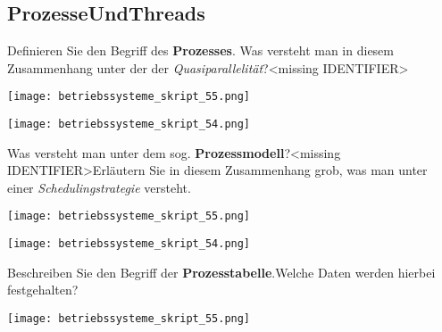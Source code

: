 \documentclass{article}
\begin{document}
\subsection{ProzesseUndThreads}
\begin{tcolorbox}[colback=white!10!white,colframe=lightgray!75!black,
  savelowerto=\jobname_ex.tex,breakable,enhanced,lines before break=40]

\justifying
Definieren Sie den Begriff des \textbf{Prozesses}. Was versteht man in diesem Zusammenhang unter der der \textit{Quasiparallelität}?<missing IDENTIFIER>

\tcblower

\justifying
\begin{center}
\texttt{[image: betriebssysteme\_skript\_55.png]}
\end{center}
\begin{center}
\texttt{[image: betriebssysteme\_skript\_54.png]}
\end{center}

\end{tcolorbox}
\begin{tcolorbox}[colback=white!10!white,colframe=lightgray!75!black,
  savelowerto=\jobname_ex.tex,breakable,enhanced,lines before break=40]

\justifying
Was versteht man unter dem sog. \textbf{Prozessmodell}?<missing IDENTIFIER>Erläutern Sie in diesem Zusammenhang grob, was man unter einer \textit{Schedulingstrategie} versteht.

\tcblower

\justifying
\begin{center}
\texttt{[image: betriebssysteme\_skript\_55.png]}
\end{center}
\begin{center}
\texttt{[image: betriebssysteme\_skript\_54.png]}
\end{center}

\end{tcolorbox}
\begin{tcolorbox}[colback=white!10!white,colframe=lightgray!75!black,
  savelowerto=\jobname_ex.tex,breakable,enhanced,lines before break=40]

\justifying
Beschreiben Sie den Begriff der \textbf{Prozesstabelle}.Welche Daten werden hierbei festgehalten?

\tcblower

\justifying
\begin{center}
\texttt{[image: betriebssysteme\_skript\_55.png]}
\end{center}

\end{tcolorbox}
\end{document}
